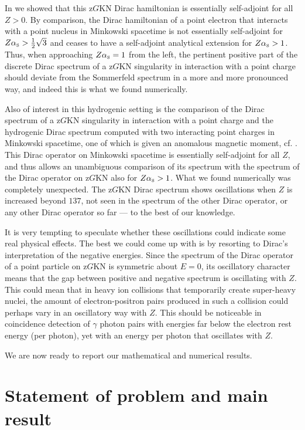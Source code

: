 \documentclass[11 pt]{article}
\renewcommand\({\left(}
\renewcommand\){\right)}
\newcommand\<{\langle}
\renewcommand\>{\rangle}
\newcommand\8{\infty}
\newcommand{\alSo} {\alpha_{\mbox{\textrm{\tiny{S}}}}}
\begin{document}
   In \cite{KTZzGKNDa} we showed that this z$G$KN Dirac hamiltonian is essentially self-adjoint for all $Z>0$.
   By comparison, the Dirac hamiltonian of a point electron that interacts with a point nucleus in Minkowski spacetime is not essentially 
self-adjoint for $Z\alSo> \frac12\sqrt{3}$ and ceases to have a self-adjoint analytical extension for $Z\alSo>1$.
 Thus, when approaching 
$Z\alSo =1$ from the left,  the pertinent positive part of the discrete Dirac spectrum of a z$G$KN singularity in interaction with a point charge should deviate
from the Sommerfeld spectrum in a more and more pronounced way, and indeed this is what we found numerically.

 Also of interest in this hydrogenic setting is the comparison of the Dirac spectrum of a z$G$KN singularity in interaction with a point charge and
 the hydrogenic Dirac spectrum computed with two interacting point charges in Minkowski spacetime, one of which is given an anomalous 
 magnetic moment, cf. \cite{ThallerBOOK}.
  This Dirac operator on Minkowski spacetime is essentially self-adjoint for all $Z$, and thus allows an unambiguous comparison of its spectrum with 
  the spectrum of the Dirac operator on z$G$KN also for $Z\alSo >1$.
  What we found numerically was completely unexpected. 
   The z$G$KN Dirac spectrum shows oscillations when $Z$ is increased beyond $137$, not seen in the spectrum of the other Dirac operator, or
   any other Dirac operator so far --- to the best of our knowledge.
  
  It is very tempting to speculate whether these oscillations could indicate some real physical effects.
   The best we could come up with is by resorting to Dirac's interpretation of the negative energies. 
    Since the spectrum of the Dirac operator of a point particle on z$G$KN is symmetric about $E=0$, its oscillatory character means that the gap between
    positive and negative spectrum is oscillating with $Z$. 
     This could mean that in heavy ion collisions that temporarily create super-heavy nuclei, the amount of electron-positron pairs produced in such a 
     collision could perhaps vary in an oscillatory way with $Z$. 
  This should be noticeable in coincidence detection of $\gamma$ photon pairs with energies far below the electron rest energy (per photon), yet with an
  energy per photon that oscillates with $Z$. 
  
   We are now ready to report our mathematical and numerical results. 
   
   \section{Statement of problem and main result}\label{allTHEREis}
\end{document}
